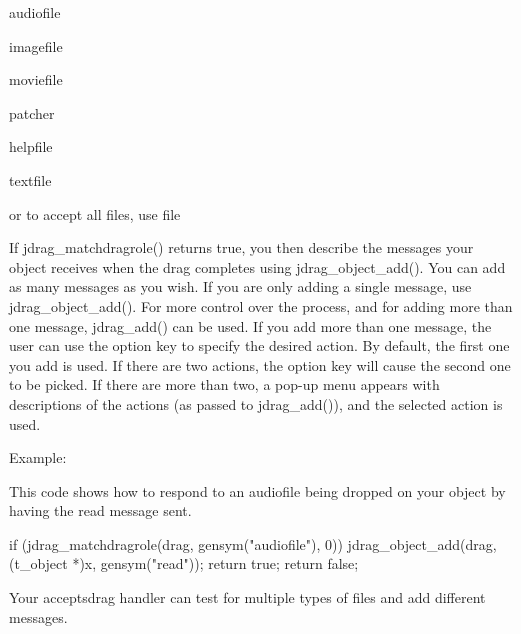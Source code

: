 \begin{DoxyItemize}
\item audiofile
\item imagefile
\item moviefile
\item patcher
\item helpfile
\item textfile
\end{DoxyItemize}

or to accept all files, use file

If jdrag\_\-matchdragrole() returns true, you then describe the messages your object receives when the drag completes using jdrag\_\-object\_\-add(). You can add as many messages as you wish. If you are only adding a single message, use jdrag\_\-object\_\-add(). For more control over the process, and for adding more than one message, jdrag\_\-add() can be used. If you add more than one message, the user can use the option key to specify the desired action. By default, the first one you add is used. If there are two actions, the option key will cause the second one to be picked. If there are more than two, a pop-\/up menu appears with descriptions of the actions (as passed to jdrag\_\-add()), and the selected action is used.

Example:

This code shows how to respond to an audiofile being dropped on your object by having the read message sent. 
\begin{DoxyCode}
        if (jdrag_matchdragrole(drag, gensym("audiofile"), 0)) {
            jdrag_object_add(drag, (t_object *)x, gensym("read"));
            return true;
        }
        return false;
\end{DoxyCode}


Your acceptsdrag handler can test for multiple types of files and add different messages. 
